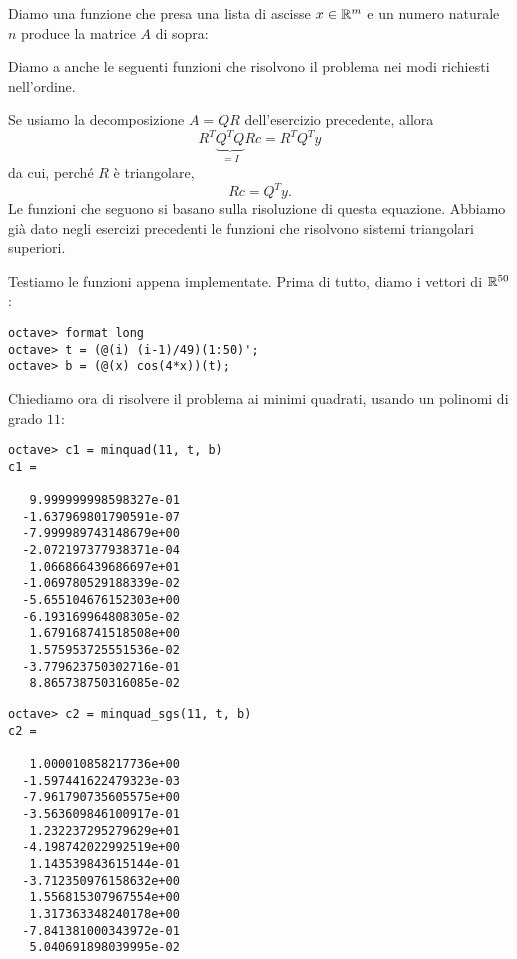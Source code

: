 Diamo una funzione che presa una lista di ascisse \(x \in \mathbb R^m\) e un numero naturale \(n\) produce la matrice \(A\) di sopra:



Diamo a anche le seguenti funzioni che risolvono il problema nei modi richiesti nell'ordine.



Se usiamo la decomposizione \(A = Q R\) dell'esercizio precedente, allora
\[R^T \underbrace{Q^T Q}_{= I} R c = R^T Q^T y\]
da cui, perché \(R\) è triangolare,
\[R c = Q^T y .\]
Le funzioni che seguono si basano sulla risoluzione di questa equazione. Abbiamo già dato negli esercizi precedenti le funzioni che risolvono sistemi triangolari superiori.





Testiamo le funzioni appena implementate. Prima di tutto, diamo i vettori di \(\mathbb R^{50}\):
\begin{lstlisting}[numbers=none]
octave> format long
octave> t = (@(i) (i-1)/49)(1:50)';
octave> b = (@(x) cos(4*x))(t);
\end{lstlisting}

Chiediamo ora di risolvere il problema ai minimi quadrati, usando un polinomi di grado \(11\):

\begin{lstlisting}[numbers=none]
octave> c1 = minquad(11, t, b)
c1 =

   9.999999998598327e-01
  -1.637969801790591e-07
  -7.999989743148679e+00
  -2.072197377938371e-04
   1.066866439686697e+01
  -1.069780529188339e-02
  -5.655104676152303e+00
  -6.193169964808305e-02
   1.679168741518508e+00
   1.575953725551536e-02
  -3.779623750302716e-01
   8.865738750316085e-02
\end{lstlisting}
%
%
\begin{lstlisting}[numbers=none]
octave> c2 = minquad_sgs(11, t, b)
c2 =

   1.000010858217736e+00
  -1.597441622479323e-03
  -7.961790735605575e+00
  -3.563609846100917e-01
   1.232237295279629e+01
  -4.198742022992519e+00
   1.143539843615144e-01
  -3.712350976158632e+00
   1.556815307967554e+00
   1.317363348240178e+00
  -7.841381000343972e-01
   5.040691898039995e-02
\end{lstlisting}

